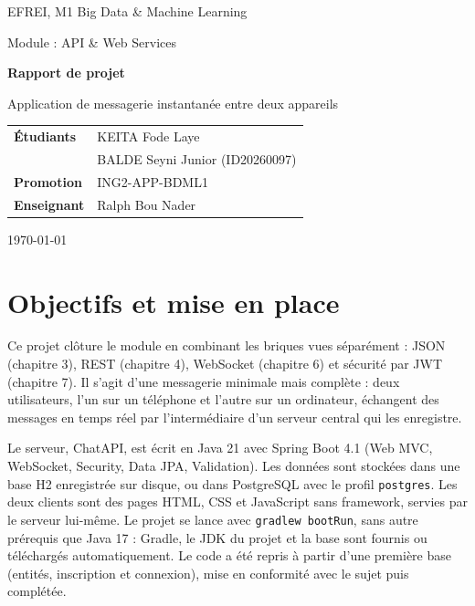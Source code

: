 \documentclass[11pt,a4paper]{article}
\begin{document}
\begin{titlepage}
\centering
\vspace*{2cm}
{\Large EFREI, M1 Big Data \& Machine Learning\par}
\vspace{0.3cm}
{\large Module : API \& Web Services\par}
\vspace{2.5cm}
{\huge\bfseries Rapport de projet\par}
\vspace{0.5cm}
{\Large Application de messagerie instantanée entre deux appareils\par}
\vspace{2.5cm}

\begin{tabular}{ll}
\textbf{Étudiants} & KEITA Fode Laye \\
 & BALDE Seyni Junior (ID20260097) \\
\textbf{Promotion} & ING2-APP-BDML1 \\
\textbf{Enseignant} & Ralph Bou Nader \\
\end{tabular}

\vfill
{\large \today\par}
\end{titlepage}

\tableofcontents
\newpage

\section{Objectifs et mise en place}

Ce projet clôture le module en combinant les briques vues séparément : JSON (chapitre 3), REST (chapitre 4), WebSocket (chapitre 6) et sécurité par JWT (chapitre 7). Il s'agit d'une messagerie minimale mais complète : deux utilisateurs, l'un sur un téléphone et l'autre sur un ordinateur, échangent des messages en temps réel par l'intermédiaire d'un serveur central qui les enregistre.

Le serveur, ChatAPI, est écrit en Java 21 avec Spring Boot 4.1 (Web MVC, WebSocket, Security, Data JPA, Validation). Les données sont stockées dans une base H2 enregistrée sur disque, ou dans PostgreSQL avec le profil \texttt{postgres}. Les deux clients sont des pages HTML, CSS et JavaScript sans framework, servies par le serveur lui-même. Le projet se lance avec \texttt{gradlew bootRun}, sans autre prérequis que Java 17 : Gradle, le JDK du projet et la base sont fournis ou téléchargés automatiquement. Le code a été repris à partir d'une première base (entités, inscription et connexion), mise en conformité avec le sujet puis complétée.
\end{document}
